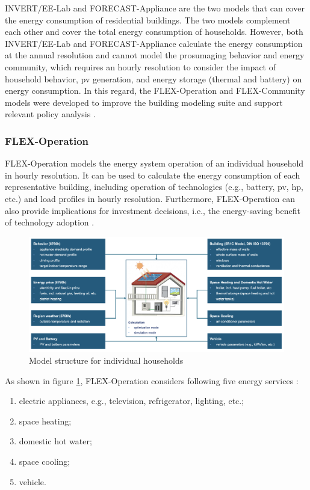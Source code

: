 INVERT/EE-Lab and FORECAST-Appliance are the two models that can cover the energy consumption of residential buildings. The two models complement each other and cover the total energy consumption of households. 
However, both INVERT/EE-Lab and FORECAST-Appliance calculate the energy consumption at the annual resolution and cannot model the prosumaging behavior and energy community, which requires an hourly resolution to consider the impact of household behavior, \gls{pv} generation, and energy storage (thermal and battery) on energy consumption. 
In this regard, the FLEX-Operation and FLEX-Community models were developed to improve the building modeling suite and support relevant policy analysis \cite{newtrends}. 


\subsubsection{FLEX-Operation}


FLEX-Operation models the energy system operation of an individual household in hourly resolution.  
It can be used to calculate the energy consumption of each representative building, including operation of technologies (e.g., battery, \gls{pv}, \gls{hp}, etc.) and load profiles in hourly resolution. 
Furthermore, FLEX-Operation can also provide implications for investment decisions, i.e., the energy-saving benefit of technology adoption \cite{newtrends}. 

\begin{figure}[h]
  \centering
  \includegraphics[width=\textwidth]{Images/flex-operation.png}
  \caption{Model structure for individual households}
  \label{fig:flex-operation}
\end{figure}

As shown in figure \ref{fig:flex-operation}, FLEX-Operation considers following five energy services \cite{newtrends}:

\begin{enumerate}
  \item electric appliances, e.g., television, refrigerator, lighting, etc.;
  \item space heating;
  \item domestic hot water;
  \item space cooling;
  \item vehicle. 
\end{enumerate}


